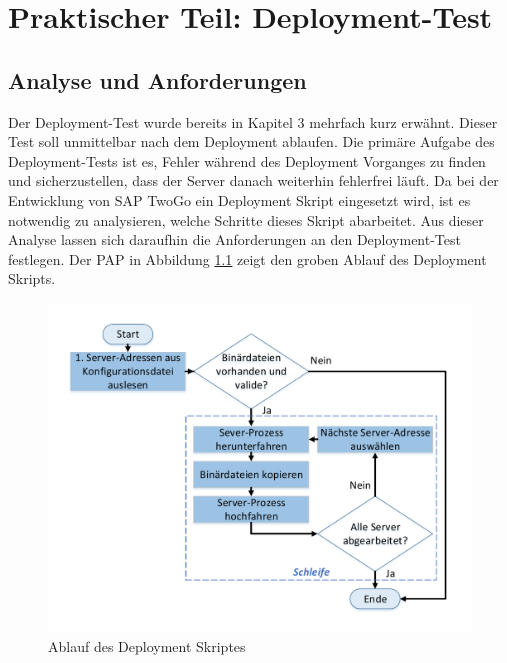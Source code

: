 
\chapter{Praktischer Teil: Deployment-Test}
\section{Analyse und Anforderungen}

Der Deployment-Test wurde bereits in Kapitel 3 mehrfach kurz erwähnt. Dieser Test soll unmittelbar nach dem Deployment ablaufen. Die primäre Aufgabe des  %
 Deployment-Tests ist es, Fehler während des Deployment Vorganges zu finden und sicherzustellen, dass der Server danach weiterhin fehlerfrei läuft. Da bei der Entwicklung von SAP TwoGo ein Deployment Skript eingesetzt wird, ist es notwendig zu analysieren, welche Schritte dieses Skript abarbeitet. Aus dieser Analyse lassen sich daraufhin die Anforderungen an den Deployment-Test festlegen. Der \acl{PAP} in Abbildung \ref{img:Deploy_Pap} zeigt den groben Ablauf des Deployment Skripts. \\
 \begin{figure}[H]
 \centering
 \vspace{-40pt}
 \includegraphics[width=1\linewidth]{../images/Deploy_Skript2.pdf}
 \vspace{-45pt}
 \caption{Ablauf des Deployment Skriptes}
 \vspace{-20pt}
 \label{img:Deploy_Pap}
 \end{figure}
 
